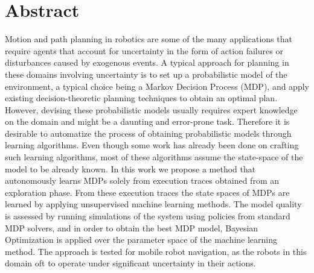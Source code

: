 \chapter*{Abstract}
\label{ch:abstract}

Motion and path planning in robotics are some of the many applications that require agents that account for uncertainty in the form of action failures or disturbances caused by exogenous events.
A typical approach for planning in these domains involving uncertainty is to set up a probabilistic model of the environment, a typical choice being a Markov Decision Process (MDP), and apply existing decision-theoretic planning techniques to obtain an optimal plan.
However, devising these probabilistic models usually requires expert knowledge on the domain and might be a daunting and error-prone task.
Therefore it is desirable to automatize the process of obtaining probabilistic models through learning algorithms.
Even though some work has already been done on crafting such learning algorithms, most of these algorithms assume the state-space of the model to be already known.
In this work we propose a method that autonomously learns MDPs solely from execution traces obtained from an exploration phase.
From these execution traces the state spaces of MDPs are learned by applying unsupervised machine learning methods.
The model quality is assessed by running simulations of the system using policies from standard MDP solvers, and in order to obtain the best MDP model, Bayesian Optimization is applied over the parameter space of the machine learning method.
The approach is tested for mobile robot navigation, as the robots in this domain oft to operate under significant uncertainty in their actions.
